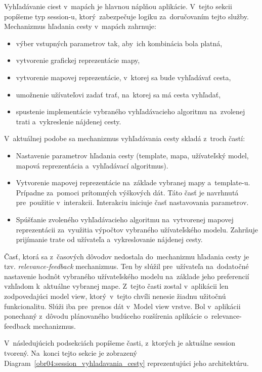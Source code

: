 Vyhľadávanie ciest v~mapách je hlavnou náplňou aplikácie. V~tejto sekcii popíšeme typ session-u, ktorý~zabezpečuje logiku za~doručovaním tejto služby. Mechanizmus hľadania cesty v~mapách zahrnuje:
\begin{itemize}
    \item výber vstupných parametrov tak, aby~ich kombinácia bola platná, 
    \item vytvorenie grafickej reprezentácie mapy,
    \item vytvorenie mapovej reprezentácie, v~ktorej sa bude vyhľadávať cesta,   
    \item umožnenie užívateľovi zadať trať, na~ktorej sa má cesta vyhľadať,
    \item spustenie implementácie vybraného vyhľadávacieho algoritmu na~zvolenej trati a~vykreslenie nájdenej cesty. 
\end{itemize} 
V~aktuálnej podobe sa mechanizmus vyhľadávania cesty skladá z~troch častí: 
\begin{itemize}
    \item Nastavenie parametrov hľadania cesty (template, mapa, užívateľský model, mapová reprezentácia a~vyhľadávací algoritmus).
    \item Vytvorenie mapovej reprezentácie na~základe vybranej mapy a~template-u. Prípadne za~pomoci prítomných výškových dát. Táto časť je navrhnutá pre~použitie v~interakcii. Interakciu iniciuje časť nastavovania parametrov. 
    \item Spúšťanie zvoleného vyhľadávacieho algoritmu na~vytvorenej mapovej reprezentácii za~využitia výpočtov vybraného užívateľského modelu. Zahrňuje prijímanie trate od užívateľa a~vykreslovanie nájdenej cesty.
\end{itemize} 

Časť, ktorá sa z~časových dôvodov nedostala do~mechanizmu hľadania cesty je tzv. \textit{relevance-feedback} mechanizmus. Ten by slúžil pre~užívateľa na~dodatočné nastavenie hodnôt vybraného užívateľského modelu na~základe jeho preferencií vzhľadom k~aktuálne vybranej mape. Z~tejto časti zostal v~aplikácii len zodpovedajúci model view, ktorý~v~tejto chvíli nenesie žiadnu užitočnú funkcionalitu. Slúži iba pre~prenos dát v~Model view vrstve. Bol v~aplikácii ponechaný z~dôvodu plánovaného budúceho rozšírenia aplikácie o~relevance-feedback mechanizmus.

V~následujúcich podsekciách popíšeme časti, z~ktorých je aktuálne session tvorený. Na~konci tejto sekcie je zobrazený Diagram~\ref{obr04:session_vyhladavania_cesty} reprezentujúci jeho architektúru.

